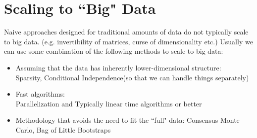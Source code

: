 \documentclass[article]{memoir}
\DeclareMathOperator{\1}{\mathbf{1}}
\theoremstyle{definition}
\begin{document}
\section{Scaling to ``Big" Data}
Naive approaches designed for traditional amounts of data do not typically scale to big data. (e.g. invertibility of matrices, curse of dimensionality etc.)
Usually we can use some combination of the following methods to scale to big data:\\
\begin{itemize}
\item Assuming that the data has inherently lower-dimensional structure:\\
    Sparsity, Conditional Independence(so that we can handle things separately)\\
\item Fast algorithms:\\
    Parallelization and Typically linear time algorithms or better\\
\item Methodology that avoids the need to fit the ``full" data: Consensus Monte Carlo, Bag of Little Bootstraps\\
\end{itemize}
\end{document}
